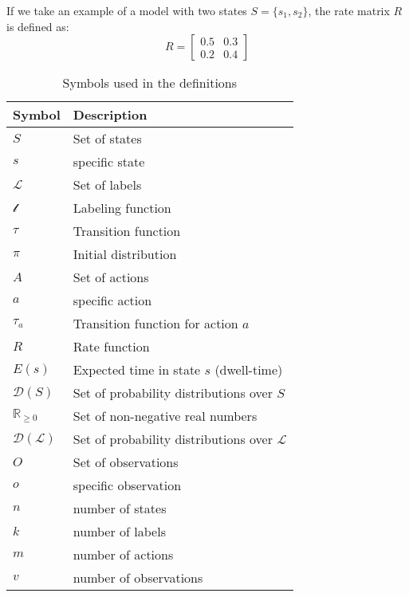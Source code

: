 If we take an example of a model with two states $S = \{s_1, s_2\}$, the rate matrix $R$ is defined as:
\begin{equation}
    R = \begin{bmatrix}
        0.5 & 0.3 \\
        0.2 & 0.4
    \end{bmatrix}   
\end{equation}


\begin{table}
    \centering
    \begin{tabular}{ll}
        \toprule
        \textbf{Symbol} & \textbf{Description} \\
        \midrule
        $S$ & Set of states \\
        $s$ & specific state \\
        $\mathcal{L}$ & Set of labels \\
        $\mathcal{l}$ & Labeling function \\
        $\tau$ & Transition function \\
        $\pi$ & Initial distribution \\
        $A$ & Set of actions \\
        $a$ & specific action \\
        $\tau_a$ & Transition function for action $a$ \\
        $R$ & Rate function \\
        $E(s)$ & Expected time in state $s$ (dwell-time) \\
        $\mathcal{D}(S)$ & Set of probability distributions over $S$ \\
        $\mathbb{R}_{\geq 0}$ & Set of non-negative real numbers \\
        $\mathcal{D}(\mathcal{L})$ & Set of probability distributions over $\mathcal{L}$ \\
        $O$ & Set of observations \\
        $o$ & specific observation \\
        $n$ & number of states \\
        $k$ & number of labels \\
        $m$ & number of actions \\
        $v$ & number of observations \\
        \bottomrule
    \end{tabular}
    \caption{Symbols used in the definitions}
    \label{tab:symbols}
\end{table}